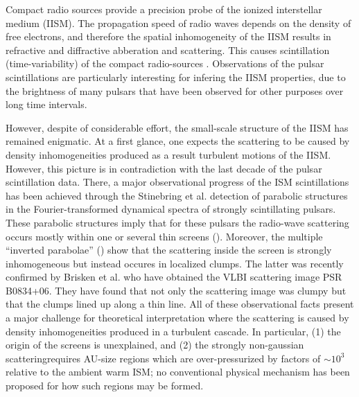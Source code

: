 \documentclass[useAMS,usenatbib]{mn2e}
\begin{document}
Compact radio sources provide a precision probe of the ionized interstellar medium
(IISM).  The propagation speed of radio waves depends on the density
of free electrons, and therefore the spatial inhomogeneity of the IISM results in refractive and diffractive
abberation and scattering. This causes scintillation (time-variability) of the compact radio-sources
 \citep{1968Natur.218..920S,1986ApJ...301L..53B,2006ApJS..165..439R} . 
Observations of the pulsar scintillations are particularly interesting for infering the IISM properties, 
due to the brightness of many pulsars that have been observed for other purposes over long time intervals.

However, despite of considerable effort, the small-scale structure of the IISM
has remained enigmatic. At a first glance, one expects the scattering to be caused by density
inhomogeneities produced as a result  turbulent motions of the IISM. However, this picture
is in contradiction with the last decade of the pulsar scintillation data.   There, a
major observational progress of the ISM scintillations has been
achieved through the Stinebring et al.\citet{2001ApJ...549L..97S}
detection of parabolic structures in the Fourier-transformed dynamical
spectra of strongly scintillating pulsars. These parabolic structures
imply that for these pulsars the radio-wave scattering occurs mostly
within one or several thin screens
(\cite{2004MNRAS.354...43W,2006ApJ...637..346C,2008MNRAS.388.1214W}).
Moreover, the multiple ``inverted
parabolae'' (\cite{2005ApJ...619L.171H}) show that the scattering
inside the screen is strongly inhomogeneous but instead occures in
localized clumps. The latter was recently confirmed by Brisken et
al.\cite{2010ApJ...708..232B} who have obtained the VLBI scattering
image PSR B0834+06. They
have found that not only the scattering image was clumpy but that the
clumps lined up along a thin line.
All of these
observational facts present a major challenge for theoretical
interpretation where the scattering is caused by density inhomogeneities produced in a turbulent
cascade. In particular, (1) the origin of the screens is unexplained,
and (2) the strongly non-gaussian scatteringrequires AU-size
regions which are over-pressurized by factors of $\sim 10^3$
relative to the ambient warm ISM\cite{1987Natur.328..324R}; no conventional
physical mechanism has been proposed for how such regions may be
formed.
\end{document}
